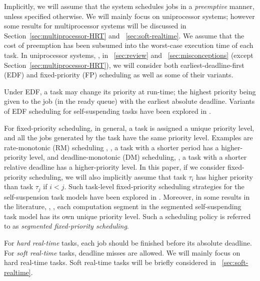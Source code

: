 

Implicitly, we will assume that the system schedules  jobs in a
\emph{preemptive} manner, unless specified otherwise.  We will mainly focus on
uniprocessor systems; however some results for multiprocessor systems
will be discussed in Section~\ref{sec:multiprocessor-HRT} and
\mysectionref{}~\ref{sec:soft-realtime}. 
We assume that the cost of preemption
has been subsumed into the worst-case execution time of each task. In
uniprocessor systems, \ie, in \mysectionref{}~\ref{sec:review} and
\mysectionref{}~\ref{sec:misconceptions} (except Section~\ref{sec:multiprocessor-HRT}), we will consider both
earliest-deadline-first (EDF) and 
fixed-priority (FP)
scheduling as well as some of their variants. 

Under EDF, 
a task may change its priority at run-time; the highest priority being given to the job (in the ready queue) with the earliest
absolute deadline. Variants of EDF scheduling for self-suspending
tasks have been explored in
\cite{RTSS-ChenL14,Liu_2014,DBLP:conf/ecrts/Devi03,WC16-suspend-DATE,Bruggen16RTNS}.

For fixed-priority scheduling, in general, a task is assigned a
unique priority level, and all the jobs generated by the task have the
same priority level. Examples are rate-monotonic (RM) scheduling
\cite{Liu_1973}, \ie, a task with a shorter period has a
higher-priority level, and deadline-monotonic (DM) scheduling, \ie,
a task with a shorter relative deadline has a higher-priority level.
In this paper, if we consider fixed-priority scheduling, we will also implicitly assume that task $\tau_i$ has higher priority than task $\tau_j$ if $i < j$.
Such task-level fixed-priority scheduling strategies for the self-suspension task models have been explored in
\cite{Raj:suspension1991,RTCSA-KimCPKH95,MingLiRTCSA1994,PH:rtss98,ECRTS-AudsleyB04,RTAS-AudsleyB04,RTCSA-BletsasA05,LR:rtas10,RTSS-KimANR13,LiuChen:rtss2014,huangpass:dac2015,Huang:multiseg,WC16-suspend-DATE,ChenECRTS2016-suspension}.
Moreover, in some results in the literature, \eg,
\cite{RTSS-KimANR13,DBLP:journals/ieicet/DingTT09}, each computation
segment in the segmented self-suspending task model has its own unique
priority level. Such a scheduling
policy is referred to as \emph{segmented fixed-priority scheduling}.

For \emph{hard real-time} tasks, each job should be finished before its
absolute deadline. For \emph{soft real-time} tasks, deadline misses are
allowed. We will mainly focus on hard real-time tasks. 
Soft real-time tasks will be briefly considered in
\mysectionref{}~\ref{sec:soft-realtime}.

